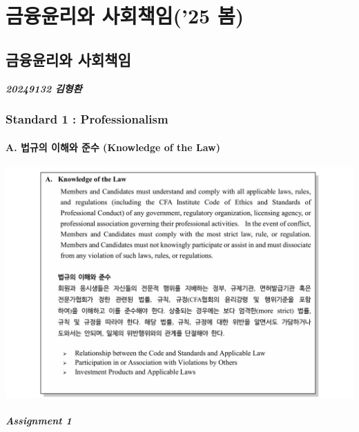 \documentclass[
  a4paper,
  DIV=11,
  numbers=noendperiod]{scrreprt}
\begin{document}
\part{금융윤리와 사회책임('25 봄)}

\chapter*{금융윤리와
사회책임}\label{uxae08uxc735uxc724uxb9acuxc640-uxc0acuxd68cuxcc45uxc784}


\textbf{\emph{20249132 김형환}}

\section*{Standard 1 :
Professionalism}\label{standard-1-professionalism}


\subsection*{A. 법규의 이해와 준수 (Knowledge of the
Law)}\label{a.-uxbc95uxaddcuxc758-uxc774uxd574uxc640-uxc900uxc218-knowledge-of-the-law}

\includegraphics{image/ethic1A.png}

\subsubsection*{\texorpdfstring{\textbf{\emph{Assignment
1}}}{Assignment 1}}\label{assignment-1}
\end{document}
